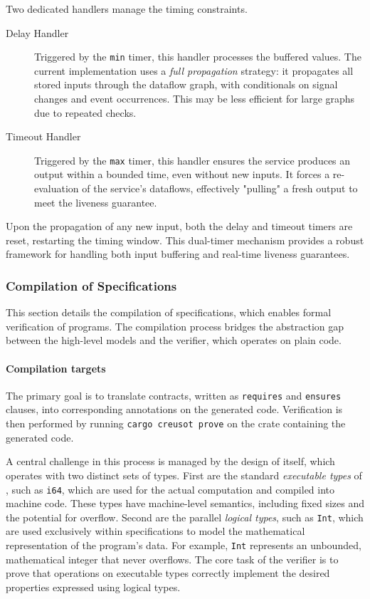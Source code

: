 Two dedicated handlers manage the timing constraints.
\begin{description}
    \item[Delay Handler] Triggered by the \texttt{min} timer, this handler processes the buffered
          values. The current implementation uses a \emph{full propagation} strategy: it propagates
          all stored inputs through the dataflow graph, with conditionals on signal changes and
          event occurrences. This may be less efficient for large graphs due to repeated checks.
    \item[Timeout Handler] Triggered by the \texttt{max} timer, this handler ensures the service
          produces an output within a bounded time, even without new inputs. It forces a
          re-evaluation of the service's dataflows, effectively "pulling" a fresh output to meet the
          liveness guarantee.
\end{description}
Upon the propagation of any new input, both the delay and timeout timers are reset, restarting the
timing window. This dual-timer mechanism provides a robust framework for handling both input
buffering and real-time liveness guarantees.

\subsubsection{Compilation of \GReusot Specifications}
\label{sec:grust:implem:choices:greusot}

This section details the compilation of \GReusot specifications, which enables formal verification
of \GRust programs. The compilation process bridges the abstraction gap between the high-level
\GRust models and the \Creusot verifier, which operates on plain \Rust code.

\paragraph{Compilation targets}

The primary goal is to translate \GReusot contracts, written as \texttt{requires} and
\texttt{ensures} clauses, into corresponding \Creusot annotations on the generated \Rust code.
Verification is then performed by running \texttt{cargo creusot prove} on the crate containing the
generated code.

A central challenge in this process is managed by the design of \Creusot itself, which operates with
two distinct sets of types. First are the standard \emph{executable types} of \Rust, such as
\texttt{i64}, which are used for the actual computation and compiled into machine code. These types
have machine-level semantics, including fixed sizes and the potential for overflow. Second are the
parallel \emph{logical types}, such as \texttt{Int}, which are used exclusively within
specifications to model the mathematical representation of the program's data. For example,
\texttt{Int} represents an unbounded, mathematical integer that never overflows. The core task of
the verifier is to prove that operations on executable types correctly implement the desired
properties expressed using logical types.

